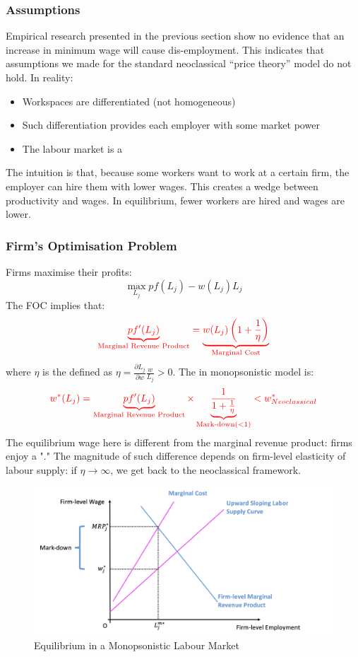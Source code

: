         \subsubsection{Assumptions}
            Empirical research presented in the previous section show no evidence that an increase in minimum wage will cause dis-employment. This indicates that assumptions we made for the standard neoclassical ``price theory'' model do not hold. In reality:
            \begin{itemize}
                \item Workspaces are differentiated (not homogeneous)
                \item Such differentiation provides each employer with some market power
                \item The labour market is a 
            \end{itemize}
            The intuition is that, because some workers want to work at a certain firm, the employer can hire them with lower wages. This creates a wedge between productivity and wages. In equilibrium, fewer workers are hired and wages are lower.
            
        \subsubsection{Firm's Optimisation Problem}
            Firms maximise their profits:
            $$\max_{L_j} pf(L_j) - w(L_j)L_j$$
            The FOC implies that:
            $$\color{red} \underbrace{pf'(L_j)}_{\text{Marginal\ Revenue\ Product}} = \underbrace{w(L_j)\left(1+\frac{1}{\eta}\right)}_{\text{Marginal\ Cost}}$$
            where $\eta$ is the  defined as $\eta = \frac{\partial L_j}{\partial w}\frac{w}{L_j} > 0$.
            The  in monopsonistic model is:
            $$\color{red} w^*(L_j)= \underbrace{pf'(L_j)}_{\text{Marginal\ Revenue\ Product}} \times \underbrace{\frac{1}{1+\frac{1}{\eta}}}_{\text{Mark-down}(<1)} < w^*_{Neoclassical}$$
            The equilibrium wage here is different from the marginal revenue product: firms enjoy a "." The magnitude of such difference depends on firm-level elasticity of labour supply: if $\eta \rightarrow \infty$, we get back to the neoclassical framework.
            \begin{figure}[H]
                \centering
                \includegraphics[width=5in]{images/ch2/Monop_LM_1.png}
                \caption{Equilibrium in a Monopsonistic Labour Market}
            \end{figure}
            
